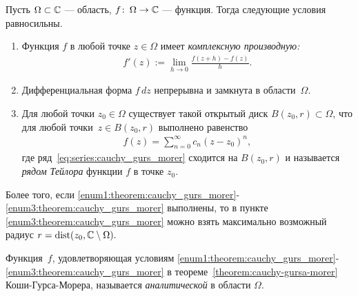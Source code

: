\documentclass[../complex-analysis.tex]{subfiles}
\begin{document}
\begin{thm}
 \label{theorem:cauchy-gursa-morer}
 Пусть $\Omega \subset \mathbb{C}$  --- область, $f\colon\,\Omega \to \mathbb{C}$  --- функция. Тогда следующие условия равносильны.
 \begin{enumerate}
  \item \label{enum1:theorem:cauchy_gurs_morer} Функция $ f $ в любой точке $z \in \Omega$ имеет \emph{комплексную производную:}
   \begin{align*}
    f'(z) := \lim_{h \to 0} \frac{f(z+h)-f(z)}{h}.
   \end{align*} 
  \item \label{enum2:theorem:cauchy_gurs_morer} Дифференциальная форма $f\,dz$ непрерывна и замкнута в области~$\Omega$.
  \item \label{enum3:theorem:cauchy_gurs_morer} Для любой точки $ z_0 \in \Omega $ существует такой открытый диск $ B(z_0, r) \subset \Omega $, что для любой точки~$ z \in B(z_0,r) $ выполнено равенство
   \begin{align}
    \label{eq:series:cauchy_gurs_morer}
    f(z) = \sum_{n=0}^{\infty} c_n(z-z_0)^{n},
   \end{align} где ряд~\eqref{eq:series:cauchy_gurs_morer} сходится на $B(z_0, r)$ и называется \emph{рядом Тейлора} функции $ f $ в точке $ z_0 $.
 \end{enumerate}
 Более того,  если \ref{enum1:theorem:cauchy_gurs_morer}-\ref{enum3:theorem:cauchy_gurs_morer} выполнены, то в пункте \ref{enum3:theorem:cauchy_gurs_morer} можно взять максимально возможный радиус $r = \mathrm{dist}(z_0, \mathbb{C} \setminus \Omega).$
\end{thm}
\begin{df}
 Функция~$ f $, удовлетворяющая условиям \ref{enum1:theorem:cauchy_gurs_morer}-\ref{enum3:theorem:cauchy_gurs_morer} в теореме~\ref{theorem:cauchy-gursa-morer} Коши-Гурса-Морера, называется \textit{аналитической} в области $ \Omega $.
\end{df}
\end{document}
